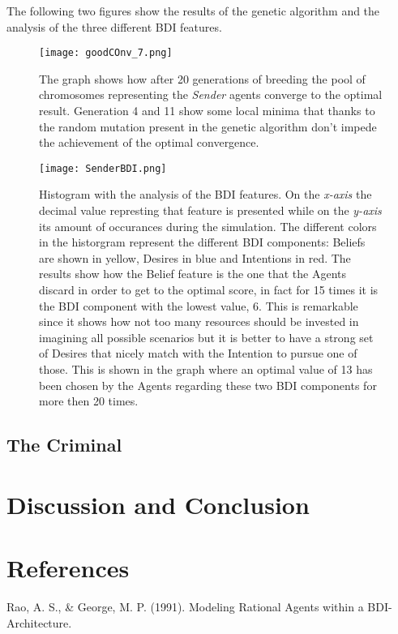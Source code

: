 \documentclass[a4paper]{article}
\begin{document}
The following two figures show the results of the genetic algorithm and the analysis of the three different BDI features.

\begin{figure}[ht!]
   \texttt{[image: goodCOnv\_7.png]}
  \caption{The graph shows how after 20 generations of breeding the pool of chromosomes representing the \textit{Sender} agents converge to the optimal result. Generation 4 and 11 show some local minima that thanks to the random mutation present in the genetic algorithm don't impede the achievement of the optimal convergence.}\label{fig:awesome_image1}
\endminipage\hfill
{}
  \texttt{[image: SenderBDI.png]}
  \caption{Histogram with the analysis of the BDI features. On the \textit{x-axis} the decimal value represting that feature is presented while on the \textit{y-axis} its amount of occurances during the simulation. The different colors in the historgram represent the different BDI components: Beliefs are shown in yellow, Desires in blue and Intentions in red. The results show how the Belief feature is the one that the Agents discard in order to get to the optimal score, in fact for 15 times it is the BDI component with the lowest value, 6. This is remarkable since it shows how not too many resources should be invested in imagining all possible scenarios but it is better to have a strong set of Desires that nicely match with the Intention to pursue one of those. This is shown in the graph where an optimal value of 13 has been chosen by the Agents regarding these two BDI components for more then 20 times.}\label{fig:awesome_image2}
\endminipage\hfill
\end{figure}


\subsection{The Criminal}

\section{Discussion and Conclusion}


\section{References}

Rao, A. S., \& George, M. P. (1991). Modeling Rational Agents within a BDI-Architecture. \\
\end{document}
